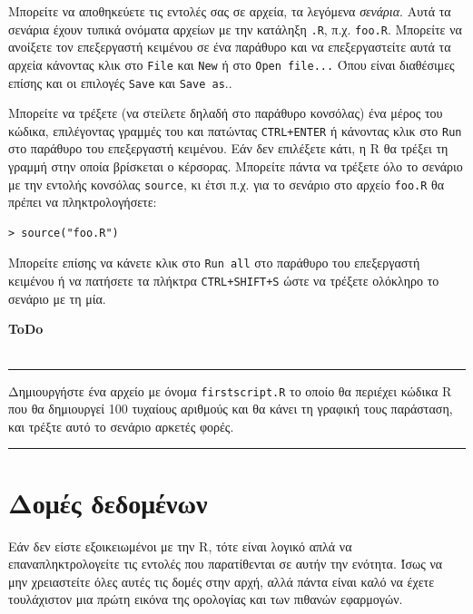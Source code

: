 \documentclass[a4paper,10pt,twocolumn]{article}
\makeatletter
\newenvironment{ToDo} {
  \begin{flushright}
    \hfill
    \begin{minipage}{0.9\columnwidth}
    \textsf{\textbf{ToDo}} \\
      \vspace{-0.7cm}\\
      {\color{Gray}\rule[-0.05cm]{\columnwidth}{1.5pt}}} {
      {\color{Gray}\rule[0.3cm]{\columnwidth}{1.5pt}}
    \end{minipage}
    \vspace{0.3cm}
  \end{flushright}
  }
\let\SF@@footnote\footnote
\def\footnote{\ifx\protect\@typeset@protect
 \expandafter\SF@@footnote
 \else
 \expandafter\SF@gobble@opt
 \fi
}
\edef\SF@gobble@opt{\noexpand\protect
 \expandafter\noexpand\csname SF@gobble@opt \endcsname}
\makeatother
\begin{document}
Μπορείτε να αποθηκεύετε τις εντολές σας σε αρχεία, τα λεγόμενα \emph{σενάρια}. Αυτά τα σενάρια έχουν τυπικά
ονόματα αρχείων με την κατάληξη \texttt{.R}, π.χ. \texttt{foo.R}. Μπορείτε να ανοίξετε τον επεξεργαστή κειμένου
σε ένα παράθυρο και να επεξεργαστείτε αυτά τα αρχεία κάνοντας κλικ στο \texttt{File} και \texttt{New} ή στο 
\texttt{Open file...}\footnote{Όπου είναι διαθέσιμες επίσης και οι επιλογές \texttt{Save} και
\texttt{Save as}.}.

Μπορείτε να τρέξετε (να στείλετε δηλαδή στο παράθυρο κονσόλας) ένα μέρος του κώδικα, επιλέγοντας γραμμές του και
πατώντας \texttt{CTRL+ENTER} ή κάνοντας κλικ στο \texttt{Run} στο παράθυρο του επεξεργαστή κειμένου. Εάν δεν
επιλέξετε κάτι, η R θα τρέξει τη γραμμή στην οποία βρίσκεται ο κέρσορας. Μπορείτε πάντα να τρέξετε όλο το
σενάριο με την εντολής κονσόλας \texttt{source}, κι έτσι π.χ. για το σενάριο στο αρχείο \texttt{foo.R} θα πρέπει
να πληκτρολογήσετε:
\begin{Verbatim}[frame=single,gobble=0]
> source("foo.R")
\end{Verbatim}
Μπορείτε επίσης να κάνετε κλικ στο \texttt{Run all} στο παράθυρο του επεξεργαστή κειμένου ή να
πατήσετε τα πλήκτρα \texttt{CTRL+SHIFT+S} ώστε να τρέξετε ολόκληρο το σενάριο με τη μία.

\begin{ToDo}
  Δημιουργήστε ένα αρχείο με όνομα \texttt{firstscript.R} το οποίο θα περιέχει κώδικα R που θα δημιουργεί 100
  τυχαίους αριθμούς και θα κάνει τη γραφική τους παράσταση, και τρέξτε αυτό το σενάριο αρκετές φορές.\\
\end{ToDo}


\section{Δομές δεδομένων} 
\label{sec:structures}

Εάν δεν είστε εξοικειωμένοι με την R, τότε είναι λογικό απλά να επαναπληκτρολογείτε τις εντολές που 
παρατίθενται σε αυτήν την ενότητα. Ίσως να μην χρειαστείτε όλες αυτές τις δομές στην αρχή, αλλά πάντα
είναι καλό να έχετε τουλάχιστον μια πρώτη εικόνα της ορολογίας και των πιθανών εφαρμογών.

\end{document}
